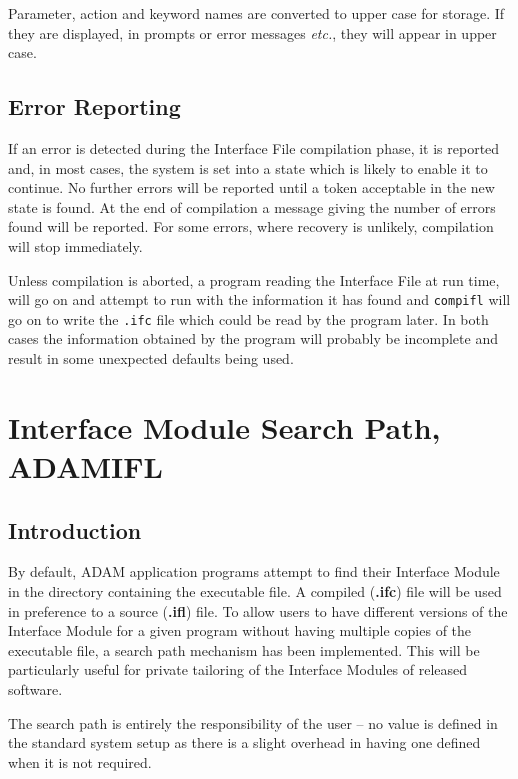 \documentclass[twoside,11pt]{article}
\newcommand{\xlabel}[1]{}
\renewcommand{\_}{\texttt{\symbol{95}}}
\begin{document}
Parameter, action and keyword names are converted to upper case for storage.
If they are displayed, in prompts or error messages {\em etc.}, they will
appear in upper case.

\subsection{Error Reporting\xlabel{error_reporting}}

If an error is detected during the Interface File compilation phase, it is
reported and, in most cases, the system is set into a state which is likely
to enable it to continue.
No further errors will be reported until a token acceptable in the new state
is found. At the end of compilation a message giving the number of errors
found will be reported.
For some errors, where recovery is unlikely, compilation will stop immediately.

Unless compilation is aborted, a program reading the Interface File at run
time, will go on and attempt to run with the information it has found and
\texttt{compifl} will go on to write the \texttt{.ifc} file which could be read
by the program later.
In both cases the information obtained by the program will probably be
incomplete and result in some unexpected defaults being used.

\newpage

\section{Interface Module Search Path, ADAM\_IFL
\xlabel{interface_module_search_path}\label{searchpath}}

\subsection{Introduction\xlabel{introduction3}}

By default, ADAM application programs  attempt to find their Interface Module
in the directory containing the executable file. A compiled ({\bf .ifc}) file
will be used in preference to a source ({\bf .ifl}) file.
To allow users to have different versions of the Interface Module for a given
program without having multiple copies of the executable file, a search path
mechanism has been implemented.
This will be particularly useful for private tailoring of the Interface
Modules of released software.

The search path is entirely the responsibility of the user --
no value is defined in the standard system setup as there is a slight overhead
in having one defined when it is not required.
\end{document}
